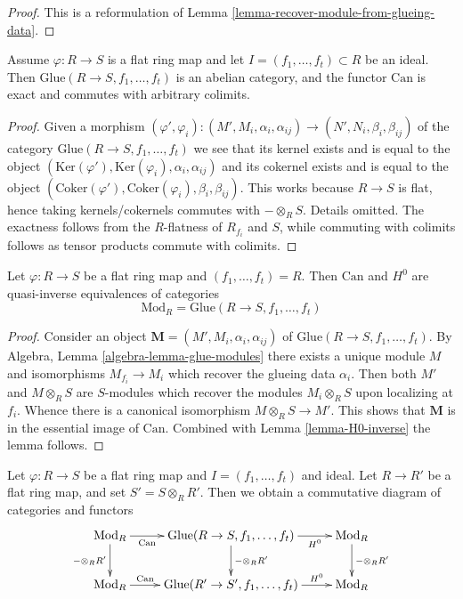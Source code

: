 \begin{proof}
This is a reformulation of
Lemma \ref{lemma-recover-module-from-glueing-data}.
\end{proof}

\begin{lemma}
\label{lemma-exact}
Assume $\varphi : R \to S$ is a flat ring map and let
$I = (f_1, \ldots, f_t) \subset R$ be an ideal.
Then $\text{Glue}(R \to S, f_1, \ldots, f_t)$ is an abelian category, and
the functor $\text{Can}$ is exact and commutes with arbitrary colimits.
\end{lemma}

\begin{proof}
Given a morphism
$(\varphi', \varphi_i) :
(M', M_i, \alpha_i, \alpha_{ij})
\to
(N', N_i, \beta_i, \beta_{ij})$
of the category $\text{Glue}(R \to S, f_1, \ldots, f_t)$
we see that its kernel exists and is equal to the object
$(\text{Ker}(\varphi'), \text{Ker}(\varphi_i), \alpha_i, \alpha_{ij})$
and its cokernel exists and is equal to the object
$(\text{Coker}(\varphi'), \text{Coker}(\varphi_i), \beta_i, \beta_{ij})$.
This works because $R \to S$ is flat, hence taking kernels/cokernels
commutes with $- \otimes_R S$. Details omitted.
The exactness follows from the $R$-flatness of $R_{f_i}$ and $S$, while
commuting with colimits follows as tensor products commute with colimits.
\end{proof}

\begin{lemma}
\label{lemma-equivalence-I-unit}
Let $\varphi : R \to S$ be a flat ring map and $(f_1, \ldots, f_t) = R$.
Then $\text{Can}$ and $H^0$ are quasi-inverse equivalences of categories
$$
\text{Mod}_R = \text{Glue}(R \to S, f_1, \ldots, f_t)
$$
\end{lemma}

\begin{proof}
Consider an object $\mathbf{M} = (M', M_i, \alpha_i, \alpha_{ij})$
of $\text{Glue}(R \to S, f_1, \ldots, f_t)$. By
Algebra, Lemma \ref{algebra-lemma-glue-modules}
there exists a unique module $M$ and isomorphisms
$M_{f_i} \to M_i$ which recover the glueing data $\alpha_i$.
Then both $M'$ and $M \otimes_R S$ are $S$-modules
which recover the modules $M_i \otimes_R S$ upon localizing at $f_i$.
Whence there is a canonical isomorphism $M \otimes_R S \to M'$.
This shows that $\mathbf{M}$ is in the essential image of $\text{Can}$.
Combined with
Lemma \ref{lemma-H0-inverse}
the lemma follows.
\end{proof}

\begin{lemma}
\label{lemma-base-change-glue}
Let $\varphi : R \to S$ be a flat ring map and $I = (f_1, \ldots, f_t)$
and ideal. Let $R \to R'$ be a flat ring map, and set $S' = S \otimes_R R'$.
Then we obtain a commutative diagram of categories and functors
$$
\xymatrix{
\text{Mod}_R \ar[r]_-{\text{Can}} \ar[d]_{-\otimes_R R'} &
\text{Glue}(R \to S, f_1, \ldots, f_t) \ar[r]_-{H^0} \ar[d]^{-\otimes_R R'} &
\text{Mod}_R \ar[d]^{-\otimes_R R'} \\
\text{Mod}_R \ar[r]^-{\text{Can}} &
\text{Glue}(R' \to S', f_1, \ldots, f_t) \ar[r]^-{H^0} &
\text{Mod}_R
}
$$
\end{lemma}

